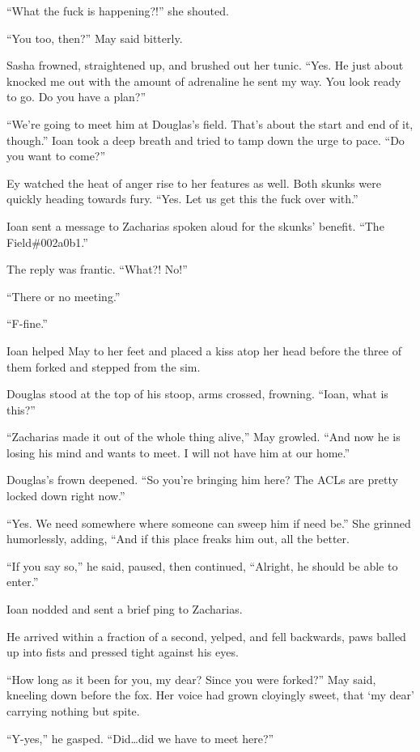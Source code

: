 ``What the fuck is happening?!'' she shouted.

``You too, then?'' May said bitterly.

Sasha frowned, straightened up, and brushed out her tunic. ``Yes. He just about knocked me out with the amount of adrenaline he sent my way. You look ready to go. Do you have a plan?''

``We're going to meet him at Douglas's field. That's about the start and end of it, though.'' Ioan took a deep breath and tried to tamp down the urge to pace. ``Do you want to come?''

Ey watched the heat of anger rise to her features as well. Both skunks were quickly heading towards fury. ``Yes. Let us get this the fuck over with.''

Ioan sent a message to Zacharias spoken aloud for the skunks' benefit. ``The Field\#002a0b1.''

The reply was frantic. ``What?! No!''

``There or no meeting.''

``F-fine.''

Ioan helped May to her feet and placed a kiss atop her head before the three of them forked and stepped from the sim.

Douglas stood at the top of his stoop, arms crossed, frowning. ``Ioan, what is this?''

``Zacharias made it out of the whole thing alive,'' May growled. ``And now he is losing his mind and wants to meet. I will not have him at our home.''

Douglas's frown deepened. ``So you're bringing him here? The ACLs are pretty locked down right now.''

``Yes. We need somewhere where someone can sweep him if need be.'' She grinned humorlessly, adding, ``And if this place freaks him out, all the better.

``If you say so,'' he said, paused, then continued, ``Alright, he should be able to enter.''

Ioan nodded and sent a brief ping to Zacharias.

He arrived within a fraction of a second, yelped, and fell backwards, paws balled up into fists and pressed tight against his eyes.

``How long as it been for you, my dear? Since you were forked?'' May said, kneeling down before the fox. Her voice had grown cloyingly sweet, that `my dear' carrying nothing but spite.

``Y-yes,'' he gasped. ``Did\ldots did we have to meet here?''

